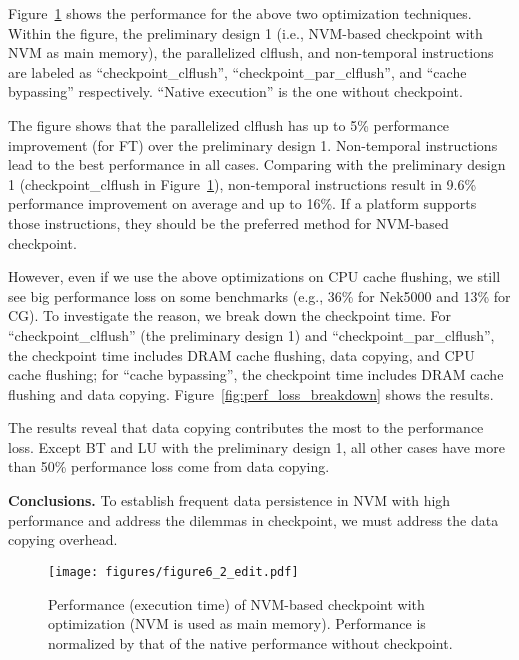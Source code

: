 
Figure~\ref{fig:prelim_design2} shows the performance for the above two optimization techniques. Within the figure, the preliminary design 1 (i.e., NVM-based checkpoint with NVM as main memory),
the parallelized {\selectfont clflush}, and non-temporal instructions are labeled as ``checkpoint\_clflush'', ``checkpoint\_par\_clflush'', and ``cache bypassing'' respectively. 
``Native execution'' is the one without checkpoint.

The figure shows that the parallelized {\selectfont clflush} has up to 5\% performance improvement (for FT) over the preliminary design 1. Non-temporal instructions lead to the best performance in all cases.
Comparing with the preliminary design 1 (checkpoint\_clflush  in Figure~\ref{fig:prelim_design2}), non-temporal instructions result in 9.6\% performance improvement on average and up to 16\%. 
If a platform supports those instructions, they should be the preferred method for NVM-based checkpoint. 

However, even if we use the above optimizations on CPU cache flushing,
we still see big performance loss on some benchmarks (e.g., 36\% for Nek5000 and 13\% for CG).
To investigate the reason, we break down the checkpoint time.
For ``checkpoint\_clflush'' (the preliminary design 1) and ``checkpoint\_par\_clflush'', the checkpoint time includes DRAM cache flushing, data copying, and CPU cache flushing; for ``cache bypassing'', the checkpoint time includes DRAM cache flushing and data copying. Figure~\ref{fig:perf_loss_breakdown} shows the results. 

The results reveal that data copying contributes the most
to the performance loss. Except BT and LU with the preliminary design 1, all other cases have more than 50\% performance loss come from data copying. 

\textbf{Conclusions.} To establish frequent data persistence in NVM with high performance and address the dilemmas in checkpoint, we must address the data copying overhead.

\begin{figure}
\centering
\texttt{[image: figures/figure6\_2\_edit.pdf]}
\vspace{-20pt}
\caption{Performance (execution time) of NVM-based checkpoint with optimization (NVM is used as main memory). Performance is normalized by that of the native performance without checkpoint.}
\label{fig:prelim_design2}
\vspace{-20pt}
\end{figure}

